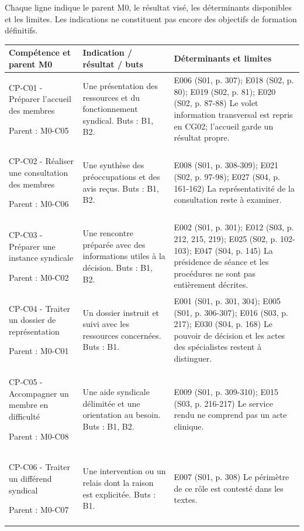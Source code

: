 \documentclass[9pt,a4paper,landscape]{extarticle}
\begin{document}
\par
\small Chaque ligne indique le parent M0, le résultat visé, les déterminants disponibles et les limites. Les indications ne constituent pas encore des objectifs de formation définitifs.\par
\renewcommand{\arraystretch}{1.12}\begin{longtable}{|p{61mm}|p{84mm}|p{115mm}|}\hline\rowcolor{pale}\textbf{Compétence et parent M0} & \textbf{Indication / résultat / buts} & \textbf{Déterminants et limites}\\\hline\endhead
CP-C01 - Préparer l’accueil des membres\par Parent : M0-C05 & Une présentation des ressources et du fonctionnement syndical. Buts : B1, B2. & E006 (S01, p. 307); E018 (S02, p. 80); E019 (S02, p. 81); E020 (S02, p. 87-88) Le volet information transversal est repris en CG02; l’accueil garde un résultat propre.\\\hline
CP-C02 - Réaliser une consultation des membres\par Parent : M0-C06 & Une synthèse des préoccupations et des avis reçus. Buts : B1, B2. & E008 (S01, p. 308-309); E021 (S02, p. 97-98); E027 (S04, p. 161-162) La représentativité de la consultation reste à examiner.\\\hline
CP-C03 - Préparer une instance syndicale\par Parent : M0-C02 & Une rencontre préparée avec des informations utiles à la décision. Buts : B1, B2. & E002 (S01, p. 301); E012 (S03, p. 212, 215, 219); E025 (S02, p. 102-103); E047 (S04, p. 145) La présidence de séance et les procédures ne sont pas entièrement décrites.\\\hline
CP-C04 - Traiter un dossier de représentation\par Parent : M0-C01 & Un dossier instruit et suivi avec les ressources concernées. Buts : B1. & E001 (S01, p. 301, 304); E005 (S01, p. 306-307); E016 (S03, p. 217); E030 (S04, p. 168) Le pouvoir de décision et les actes des spécialistes restent à distinguer.\\\hline
CP-C05 - Accompagner un membre en difficulté\par Parent : M0-C08 & Une aide syndicale délimitée et une orientation au besoin. Buts : B1, B2. & E009 (S01, p. 309-310); E015 (S03, p. 216-217) Le service rendu ne comprend pas un acte clinique.\\\hline
CP-C06 - Traiter un différend syndical\par Parent : M0-C07 & Une intervention ou un relais dont la raison est explicitée. Buts : B1. & E007 (S01, p. 308) Le périmètre de ce rôle est contesté dans les textes.\\\hline

\end{longtable}
\end{document}
